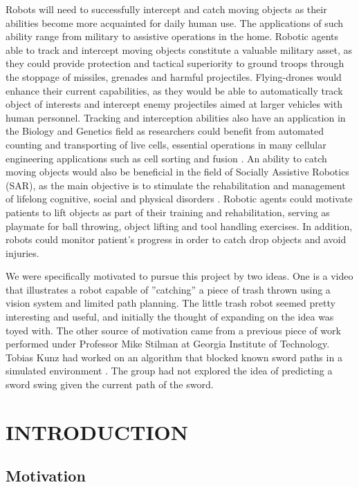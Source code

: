 \documentclass[letterpaper, 10 pt, conference]{ieeeconf}  %
\begin{document}
Robots will need to successfully intercept and catch moving objects as their
abilities become more acquainted for daily human use. The applications of such
ability range from military to assistive operations in the home. Robotic agents
able to track and intercept moving objects constitute a valuable military
asset, as they could provide protection and tactical superiority to ground
troops through the stoppage of missiles, grenades and harmful projectiles.
Flying-drones would enhance their current capabilities, as they would be able
to automatically track object of interests and intercept enemy projectiles
aimed at larger vehicles with human personnel.  Tracking and interception
abilities also have an application in the Biology and Genetics field as
researchers could benefit from automated counting and transporting of live
cells, essential operations in many cellular engineering applications such as
cell sorting and fusion \cite{5985660}. An ability to catch moving objects
would also be beneficial in the field of Socially Assistive Robotics (SAR), as
the main objective is to stimulate the rehabilitation and management of
lifelong cognitive, social and physical disorders \cite{5569021}. Robotic
agents could motivate patients to lift objects as part of their training and
rehabilitation, serving as playmate for ball throwing, object lifting and tool
handling exercises. In addition, robots could monitor patient’s progress in
order to catch drop objects and avoid injuries.

We were specifically motivated to pursue this project by two ideas. One is a
video that illustrates a robot capable of ”catching” a piece of trash thrown
using a vision system and limited path planning. The little trash robot seemed
pretty interesting and useful, and initially the thought of expanding on the
idea was toyed with. The other source of motivation came from a previous piece
of work performed under Professor Mike Stilman at Georgia Institute of
Technology. Tobias Kunz had worked on an algorithm that blocked known sword
paths in a simulated environment \cite{lampariello2011trajectory}. The group
had not explored the idea of predicting a sword swing given the current path of
the sword.

\section{INTRODUCTION}

\subsection{Motivation}
\end{document}
